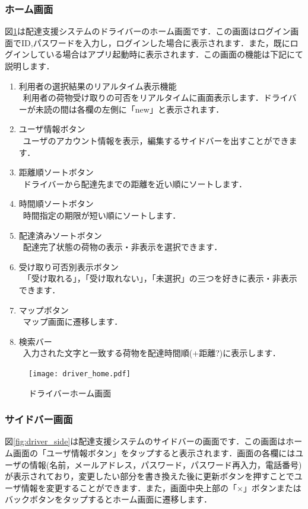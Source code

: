 \documentclass[a4j,titlepage]{jarticle}
\begin{document}
\subsubsection{ホーム画面}
図\ref{fig:driver_home}は配達支援システムのドライバーのホーム画面です．この画面はログイン画面でID,パスワードを入力し，ログインした場合に表示されます．また，既にログインしている場合はアプリ起動時に表示されます．この画面の機能は下記にて説明します．
\begin{enumerate}
	\item 利用者の選択結果のリアルタイム表示機能\\
	 \ 利用者の荷物受け取りの可否をリアルタイムに画面表示します．ドライバーが未読の間は各欄の左側に「new」と表示されます．
	\item ユーザ情報ボタン\\
	 \ ユーザのアカウント情報を表示，編集するサイドバーを出すことができます．
	\item 距離順ソートボタン\\
	 \ ドライバーから配達先までの距離を近い順にソートします．
	\item 時間順ソートボタン\\
   \ 時間指定の期限が短い順にソートします．
	\item 配達済みソートボタン\\
   \ 配達完了状態の荷物の表示・非表示を選択できます．
	\item 受け取り可否別表示ボタン\\
	 \ 「受け取れる」，「受け取れない」，「未選択」の三つを好きに表示・非表示できます．
	\item マップボタン\\
   \ マップ画面に遷移します．
	\item 検索バー\\
	 \ 入力された文字と一致する荷物を配達時間順(+距離?)に表示します．
\end{enumerate}

\begin{figure}[htbp]
 \begin{center}
  \texttt{[image: driver\_home.pdf]}
	\caption{ドライバーホーム画面}
	\label{fig:driver_home}
 \end{center}

\end{figure}




\subsubsection{サイドバー画面}
図\ref{fig:driver_side}は配達支援システムのサイドバーの画面です．この画面はホーム画面の「ユーザ情報ボタン」をタップすると表示されます．画面の各欄にはユーザの情報(名前，メールアドレス，パスワード，パスワード再入力，電話番号)が表示されており，変更したい部分を書き換えた後に更新ボタンを押すことでユーザ情報を変更することができます．また，画面中央上部の「×」ボタンまたはバックボタンをタップするとホーム画面に遷移します．
\end{document}
